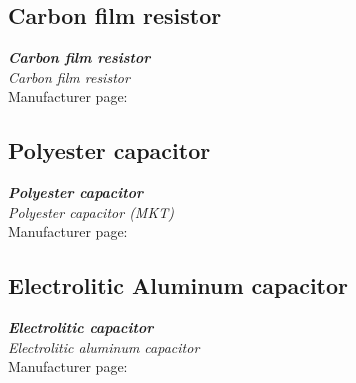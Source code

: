 \clearpage


\subsection{Carbon film resistor}
\label{datasheet_CARBONFILMRESISTOR}
\emph{\textbf{Carbon film resistor}}\\
\emph{Carbon film resistor}\\
\vspace{5pt}
Manufacturer page:	\\




\subsection{Polyester capacitor}
\label{datasheet_POLYESTER_CAPACITOR}
\emph{\textbf{Polyester capacitor}}\\
\emph{Polyester capacitor (MKT)}\\
\vspace{5pt}
Manufacturer page:	\\


\subsection{Electrolitic Aluminum capacitor}
\label{datasheet_ELECTROLITIC_CAPACITOR}
\emph{\textbf{Electrolitic capacitor}}\\
\emph{Electrolitic aluminum capacitor}\\
\vspace{5pt}
Manufacturer page:	\\








